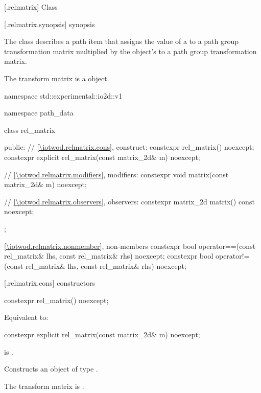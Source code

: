  [\iotwod.relmatrix] {Class }%

 [\iotwod.relmatrix.synopsis] { synopsis}%

\pnum
{}%
The class  describes a path item that assigns the value of a to a path group transformation matrix multiplied by the  object's  to a path group transformation matrix.

\pnum
The transform matrix is a  object.

\begin{codeblock}
namespace std::experimental::io2d::v1 {
  namespace path_data {
    class rel_matrix {
    public:
      // \ref{\iotwod.relmatrix.cons}, construct:
      constexpr rel_matrix() noexcept;
      constexpr explicit rel_matrix(const matrix_2d& m) noexcept;

      // \ref{\iotwod.relmatrix.modifiers}, modifiers:
      constexpr void matrix(const matrix_2d& m) noexcept;

      // \ref{\iotwod.relmatrix.observers}, observers:
      constexpr matrix_2d matrix() const noexcept;
    };
    
    \ref{\iotwod.relmatrix.nonmember}, non-members
    constexpr bool operator==(const rel_matrix& lhs, const rel_matrix& rhs) 
      noexcept;
    constexpr bool operator!=(const rel_matrix& lhs, const rel_matrix& rhs) 
      noexcept;
  }
}
\end{codeblock}

 [\iotwod.relmatrix.cons] { constructors}

%
\begin{itemdecl}
constexpr rel_matrix() noexcept;
\end{itemdecl}
\begin{itemdescr}
\pnum
\effects
Equivalent to: 
\end{itemdescr}

%
\begin{itemdecl}
constexpr explicit rel_matrix(const matrix_2d& m) noexcept;
\end{itemdecl}
\begin{itemdescr}
\pnum
\requires
{} is .

\pnum
\effects
Constructs an object of type .

\pnum
The transform matrix is .
\end{itemdescr}

